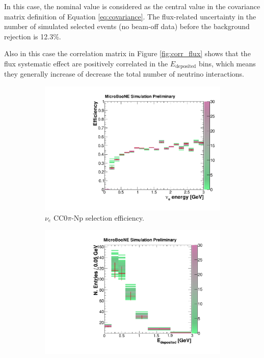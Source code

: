 In this case, the nominal value is considered as the central value in the covariance matrix definition of Equation \ref{eq:covariance}.
The flux-related uncertainty in the number of simulated selected events (no beam-off data) before the background rejection is 12.3\%.

Also in this case the correlation matrix in Figure \ref{fig:corr_flux} shows that the flux systematic effect are positively correlated in the $E_{\mathrm{deposited}}$ bins, which means they generally increase of decrease the total number of neutrino interactions. 

\begin{figure}[htbp]
  \begin{center}
    \begin{subfigure}{0.49\textwidth}
      \includegraphics[width=\linewidth]{figures/eff_ene_flux.pdf}
      \caption{$\nu_{e}$ CC0$\pi$-Np selection efficiency.}  \label{fig:eff_flux}
    \end{subfigure}\hfill
    \begin{subfigure}{0.49\textwidth}
      \vspace{0.5em}
      \includegraphics[width=\linewidth]{figures/reco_flux.pdf}

\end{subfigure}
\end{center}
\end{figure}
